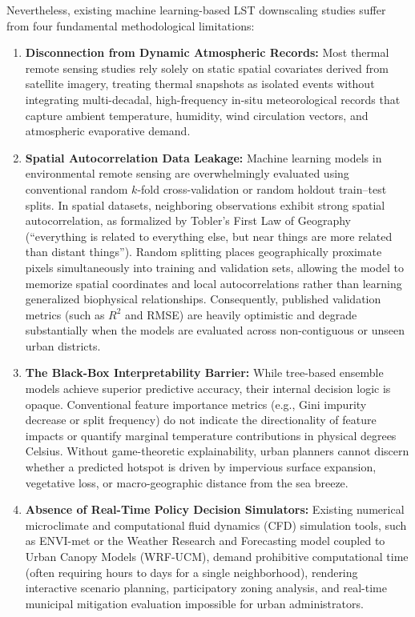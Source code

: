 \documentclass[a4paper,fleqn]{cas-sc}
\begin{document}
Nevertheless, existing machine learning-based LST downscaling studies suffer from four fundamental methodological limitations:
\begin{enumerate}[1.]
    \item \textbf{Disconnection from Dynamic Atmospheric Records:} Most thermal remote sensing studies rely solely on static spatial covariates derived from satellite imagery, treating thermal snapshots as isolated events without integrating multi-decadal, high-frequency in-situ meteorological records that capture ambient temperature, humidity, wind circulation vectors, and atmospheric evaporative demand.
    \item \textbf{Spatial Autocorrelation Data Leakage:} Machine learning models in environmental remote sensing are overwhelmingly evaluated using conventional random $k$-fold cross-validation or random holdout train--test splits. In spatial datasets, neighboring observations exhibit strong spatial autocorrelation, as formalized by Tobler's First Law of Geography (``everything is related to everything else, but near things are more related than distant things''). Random splitting places geographically proximate pixels simultaneously into training and validation sets, allowing the model to memorize spatial coordinates and local autocorrelations rather than learning generalized biophysical relationships. Consequently, published validation metrics (such as $R^2$ and RMSE) are heavily optimistic and degrade substantially when the models are evaluated across non-contiguous or unseen urban districts.
    \item \textbf{The Black-Box Interpretability Barrier:} While tree-based ensemble models achieve superior predictive accuracy, their internal decision logic is opaque. Conventional feature importance metrics (e.g., Gini impurity decrease or split frequency) do not indicate the directionality of feature impacts or quantify marginal temperature contributions in physical degrees Celsius. Without game-theoretic explainability, urban planners cannot discern whether a predicted hotspot is driven by impervious surface expansion, vegetative loss, or macro-geographic distance from the sea breeze.
    \item \textbf{Absence of Real-Time Policy Decision Simulators:} Existing numerical microclimate and computational fluid dynamics (CFD) simulation tools, such as ENVI-met or the Weather Research and Forecasting model coupled to Urban Canopy Models (WRF-UCM), demand prohibitive computational time (often requiring hours to days for a single neighborhood), rendering interactive scenario planning, participatory zoning analysis, and real-time municipal mitigation evaluation impossible for urban administrators.
\end{enumerate}
\end{document}

